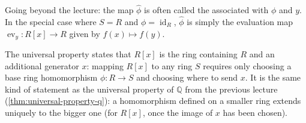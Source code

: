 \begin{content}

\begin{steps}
Going beyond the lecture: the map $\hat{\phi}$ is often called the  associated with $\phi$ and $y$. In the special case where $S = R$ and $\phi = \operatorname{id}_R$, $\hat{\phi}$ is simply the evaluation map $\operatorname{ev}_y \colon R[x] \to R$ given by $f(x) \mapsto f(y)$. 

The universal property states that $R[x]$ is the  ring containing $R$ and an additional generator $x$: mapping $R[x]$ to any ring $S$ requires only choosing a base ring homomorphism $\phi \colon R \to S$ and choosing where to send $x$. It is the same kind of statement as the universal property of $\mathbb{Q}$ from the previous lecture (\cref{thm:universal-property-q}): a homomorphism defined on a smaller ring extends uniquely to the bigger one (for $R[x]$, once the image of $x$ has been chosen).
\end{steps}
\end{content}

